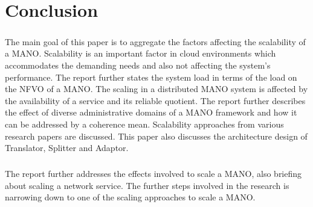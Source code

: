 \chapter{Conclusion}
\label{ch:Conclusion}

\paragraph{}The main goal of this paper is to aggregate the factors affecting the scalability of a MANO. Scalability is an important factor in cloud environments which accommodates the demanding needs and also not affecting the system’s performance. The report further states the system load in terms of the load on the NFVO of a MANO. The scaling in a distributed MANO system is affected by the availability of a service and its reliable quotient. The report further describes the effect of diverse administrative domains of a MANO framework and how it can be addressed by a coherence mean. Scalability approaches from various research papers are discussed. This paper also discusses the architecture design of Translator, Splitter and Adaptor.


\paragraph{} The report further addresses the effects involved to scale a MANO, also briefing about scaling a network service. The further steps involved in the research is narrowing down to one of the scaling approaches to scale a MANO.




